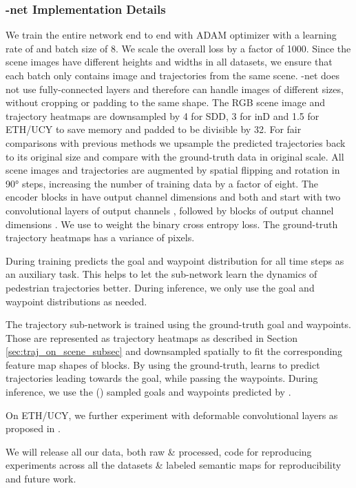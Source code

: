 \documentclass[final]{cvpr}
\begin{document}
\subsubsection{-net Implementation Details}
We train the entire network end to end with ADAM optimizer with a learning rate of  and batch size of 8. We scale the overall loss by a factor of 1000.
Since the scene images  have different heights and widths in all datasets, we ensure that each batch only contains image and trajectories from the same scene. -net does not use fully-connected layers and therefore can handle images of different sizes, without cropping or padding to the same shape. The RGB scene image  and trajectory heatmaps  are downsampled by 4 for SDD, 3 for inD and 1.5 for ETH/UCY to save memory and padded to be divisible by 32. For fair comparisons with previous methods we upsample the predicted trajectories back to its original size and compare with the ground-truth data in original scale. All scene images and trajectories are augmented by spatial flipping and rotation in 90° steps, increasing the number of training data by a factor of eight. The encoder blocks in  have output channel dimensions  and both  and  start with two convolutional layers of output channels , followed by blocks of output channel dimensions . We use  to weight the binary cross entropy loss. The ground-truth trajectory heatmaps has a variance of  pixels.

During training  predicts the goal and waypoint distribution for all  time steps as an auxiliary task. This helps to let the sub-network learn the dynamics of pedestrian trajectories better. During inference, we only use the goal and  waypoint distributions as needed.

The trajectory sub-network  is trained using the ground-truth goal and waypoints. Those are represented as trajectory heatmaps as described in Section \ref{sec:traj_on_scene_subsec} and downsampled spatially to fit the corresponding feature map shapes of  blocks. By using the ground-truth,  learns to predict trajectories leading towards the goal, while passing the waypoints. During inference, we use the () sampled goals and waypoints predicted by .

On ETH/UCY, we further experiment with deformable convolutional layers as proposed in \cite{dai2017deformable}.

We will release all our data, both raw \& processed, code for reproducing experiments across all the datasets \& labeled semantic maps for reproducibility and future work. 
\end{document}
